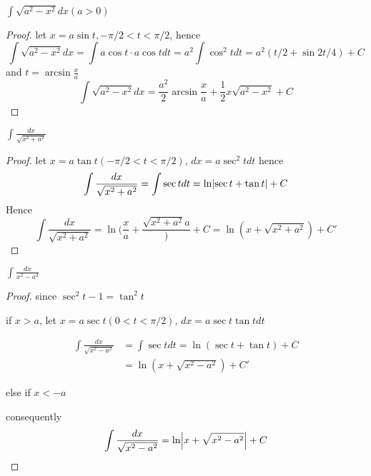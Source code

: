 \documentclass[11pt]{article}
\begin{document}
\begin{proposition}[]
\(\int\sqrt{a^2-x^2}dx(a>0)\)
\end{proposition}

\begin{proof}
let \(x=a\sin t,-\pi/2<t<\pi/2\), hence
\begin{equation*}
\int\sqrt{a^2-x^2}dx=\int a\cos t\cdot a\cos tdt=a^2\int\cos^2tdt=a^2(t/2+\sin2t/4)+C
\end{equation*}
and \(t=\arcsin\frac{x}{a}\)
\begin{equation*}
\int\sqrt{a^2-x^2}dx=\frac{a^2}{2}\arcsin\frac{x}{a}+\frac{1}{2}x\sqrt{a^2-x^2}+C
\end{equation*}
\end{proof}

\begin{proposition}[]
\(\int\frac{dx}{\sqrt{x^2+a^2}}\)
\end{proposition}

\begin{proof}
let \(x=a\tan t(-\pi/2<t<\pi/2)\), \(dx=a\sec^2tdt\)
hence
\begin{equation*}
\int\frac{dx}{\sqrt{x^2+a^2}}=\int\sec tdt=\ln\abs{\sec t+\tan t}+C
\end{equation*}
Hence
\begin{equation*}
\int\frac{dx}{\sqrt{x^2+a^2}}=\ln(\frac{x}{a}+\frac{\sqrt{x^2+a^2}{a}})+C=\ln(x+\sqrt{x^2+a^2})+C'
\end{equation*}
\end{proof}

\begin{proposition}[]
\(\int\frac{dx}{x^2-a^2}\)
\end{proposition}

\begin{proof}
since \(\sec^2t-1=\tan^2t\)

if \(x>a\), let \(x=a\sec t(0<t<\pi/2)\), \(dx=a\sec t\tan tdt\)

\begin{align*}
\int\frac{dx}{\sqrt{x^2-a^2}}&=\int\sec tdt=\ln(\sec t+\tan t)+C\\
&=\ln(x+\sqrt{x^2-a^2})+C'
\end{align*}

else if \(x<-a\)

consequently
\begin{equation*}
\int\frac{dx}{\sqrt{x^2-a^2}}=\ln\abs{x+\sqrt{x^2-a^2}}+C
\end{equation*}
\end{proof}
\end{document}
